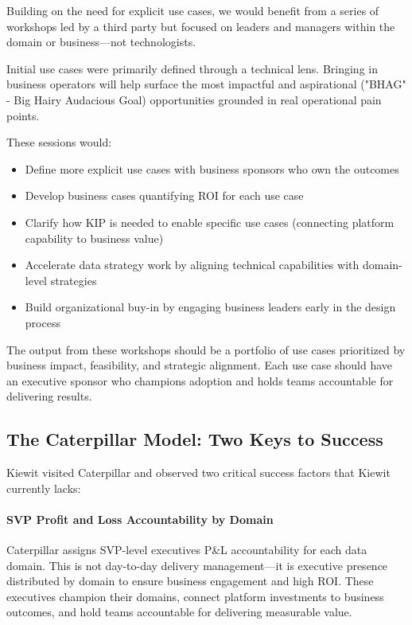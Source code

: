 \documentclass[12pt, a4paper]{article}
\begin{document}
Building on the need for explicit use cases, we would benefit from a series of workshops led by a third party but focused on leaders and managers within the domain or business—not technologists.

Initial use cases were primarily defined through a technical lens. Bringing in business operators will help surface the most impactful and aspirational ("BHAG" - Big Hairy Audacious Goal) opportunities grounded in real operational pain points.

These sessions would:

\begin{itemize}[leftmargin=*, nosep]
    \item Define more explicit use cases with business sponsors who own the outcomes
    \item Develop business cases quantifying ROI for each use case
    \item Clarify how KIP is needed to enable specific use cases (connecting platform capability to business value)
    \item Accelerate data strategy work by aligning technical capabilities with domain-level strategies
    \item Build organizational buy-in by engaging business leaders early in the design process
\end{itemize}

The output from these workshops should be a portfolio of use cases prioritized by business impact, feasibility, and strategic alignment. Each use case should have an executive sponsor who champions adoption and holds teams accountable for delivering results.

\subsection{The Caterpillar Model: Two Keys to Success}

Kiewit visited Caterpillar and observed two critical success factors that Kiewit currently lacks:

\paragraph{SVP Profit and Loss Accountability by Domain}
Caterpillar assigns SVP-level executives P\&L accountability for each data domain. This is not day-to-day delivery management—it is executive presence distributed by domain to ensure business engagement and high ROI. These executives champion their domains, connect platform investments to business outcomes, and hold teams accountable for delivering measurable value.
\end{document}
